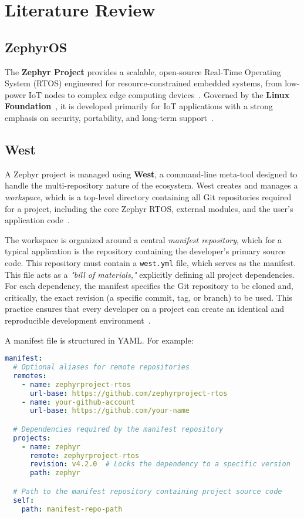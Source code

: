 \chapter{Literature Review}

\section{ZephyrOS}

The \textbf{Zephyr Project} provides a scalable, open-source Real-Time Operating System (RTOS) engineered for resource-constrained embedded systems, from low-power IoT nodes to complex edge computing devices~\cite{zephyr_intro}. Governed by the \textbf{Linux Foundation}~\cite{zephyr_website}, it is developed primarily for IoT applications with a strong emphasis on security, portability, and long-term support~\cite{zephyr_intro}.

\section{West}

A Zephyr project is managed using \textbf{West}, a command-line meta-tool designed to handle the multi-repository nature of the ecosystem. West creates and manages a \textit{workspace}, which is a top-level directory containing all Git repositories required for a project, including the core Zephyr RTOS, external modules, and the user's application code~\cite{zephyr_west}.

The workspace is organized around a central \textit{manifest repository}, which for a typical application is the repository containing the developer's primary source code. This repository must contain a \texttt{west.yml} file, which serves as the manifest. This file acts as a \textit{"bill of materials,"} explicitly defining all project dependencies. For each dependency, the manifest specifies the Git repository to be cloned and, critically, the exact revision (a specific commit, tag, or branch) to be used. This practice ensures that every developer on a project can create an identical and reproducible development environment~\cite{zephyr_west}.

A manifest file is structured in YAML. For example:

\medskip

\begin{lstlisting}[language=yaml]
manifest:
  # Optional aliases for remote repositories
  remotes:
    - name: zephyrproject-rtos
      url-base: https://github.com/zephyrproject-rtos
    - name: your-github-account
      url-base: https://github.com/your-name

  # Dependencies required by the manifest repository
  projects:
    - name: zephyr
      remote: zephyrproject-rtos
      revision: v4.2.0  # Locks the dependency to a specific version
      path: zephyr

  # Path to the manifest repository containing project source code
  self:
    path: manifest-repo-path
\end{lstlisting}


